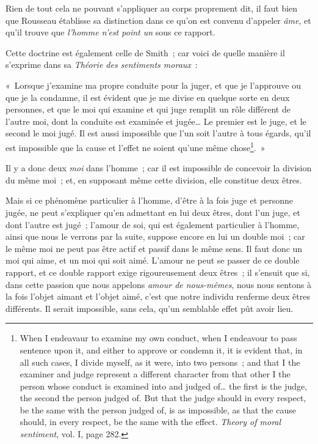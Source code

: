 \documentclass[french,twoside]{book} %
\begin{document}
Rien de tout cela ne pouvant s’appliquer au corps proprement dit, il faut bien que Rousseau établisse sa distinction dans ce qu’on est convenu d’appeler {\itshape âme}, et qu’il trouve que {\itshape l’homme n’est point un} sous ce rapport.\par
Cette doctrine est également celle de Smith ; car voici de quelle manière il s’exprime dans sa {\itshape Théorie des sentiments moraux} :\par
« Lorsque j’examine ma propre conduite pour la juger, et que je l’approuve ou que je la condamne, il est évident que je me divise en quelque sorte en deux personnes, et que le moi qui examine et qui juge remplit un rôle différent de l’autre moi, dont la conduite est examinée et jugée… Le premier est le juge, et le second le moi jugé. Il est aussi impossible que l’un soit l’autre à tous égards, qu’il est impossible que la cause et l’effet ne soient qu’une même chose\footnote{When I endeavaur to examine my own conduct, when I endeavour to pass sentence upon it, and either to approve or condemn it, it is evident that, in all such cases, I divide myself, as it were, into two persons ; and that I the examiner and judge represent a different character from that other I the person whose conduct is examined into and judged of… the first is the judge, the second the person judged of. But that the judge should in every respect, be the same with the person judged of, is as impossible, as that the cause should, in every respect, be the same with the effect. {\itshape Theory of moral sentiment}, vol. I, page 282.}. »\par
Il y a donc deux {\itshape moi} dans l’homme ; car il est impossible de concevoir la division du même moi ; et, en supposant même cette division, elle constitue deux êtres.\par
Mais si ce phénomène particulier à l’homme, d’être à la fois juge et personne jugée, ne peut s’expliquer qu’en admettant en lui deux êtres, dont l’un juge, et dont l’autre est jugé ; l’amour de soi, qui est également particulier à l’homme, ainsi que nous le verrons par la suite, suppose encore en lui un double moi ; car le même moi ne peut pas être actif et passif dans le même sens. Il faut donc un moi qui aime, et un moi qui soit aimé. L’amour ne peut se passer de ce double rapport, et ce double rapport exige rigoureusement deux êtres ; il s’ensuit que si, dans cette passion que nous appelons {\itshape amour de nous-mêmes}, nous nous sentons à la fois l’objet aimant et l’objet aimé, c’est que notre individu renferme deux êtres différents. Il serait impossible, sans cela, qu’un semblable effet pût avoir lieu.\par
\end{document}
